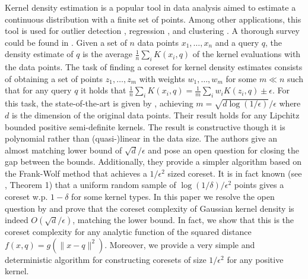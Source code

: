 \documentclass[anon,12pt]{colt2019} %
\newcommand{\eps}{\epsilon}
\begin{document}
Kernel density estimation is a popular tool in data analysis aimed to estimate a continuous distribution with a finite set of points. Among other applications, this tool is used for outlier detection \cite{schubert2014generalized}, regression \cite{fan2018local}, and clustering \cite{rinaldo2010generalized}. A thorough survey could be found in \cite{silverman2018density}. Given a set of $n$ data points $x_1,\ldots,x_n$ and a query $q$, the density estimate of $q$ is the average $\frac{1}{n} \sum_i K(x_i,q)$ of the kernel evaluations with the data points. The task of finding a coreset for kernel density estimates consists of obtaining a set of points $z_1,\ldots,z_m$ with weights $w_1,\ldots,w_m$ for some $m \ll n$ such that for any query $q$ it holds that 
$\frac{1}{n} \sum_i K(x_i,q) = \frac{1}{m} \sum_i w_i K(z_i,q) \pm \eps$. For this task, the state-of-the-art is given by \cite{DBLP:journals/corr/abs-1802-01751}, achieving $m=\sqrt{d\log(1/\eps)}/\eps$ where $d$ is the dimension of the original data points. Their result holds for any Lipchitz bounded positive semi-definite kernels. The result is constructive though it is polynomial rather than (quasi-)linear in the data size. The authors give an almost matching lower bound of $\sqrt{d}/\eps$ and pose an open question for closing the gap between the bounds. Additionally, they provide a simpler algorithm based on the Frank-Wolf method that achieves a $1/\eps^2$ sized coreset. It is in fact known (see \cite{lopez2015towards}, Theorem 1) that a uniform random sample of $\log(1/\delta)/\eps^2$ points gives a coreset w.p. $1-\delta$ for some kernel types. 
In this paper we resolve the open question by \cite{DBLP:journals/corr/abs-1802-01751} and prove that the coreset complexity of Gaussian kernel density is indeed $O(\sqrt{d}/\eps)$, matching the lower bound. 
In fact, we show that this is the coreset complexity for any analytic function of the squared distance $f(x,q) = g(\|x-q\|^2)$.
Moreover, we provide a very simple and deterministic algorithm for constructing coresets of size $1/\eps^2$ for any positive kernel.
\end{document}
